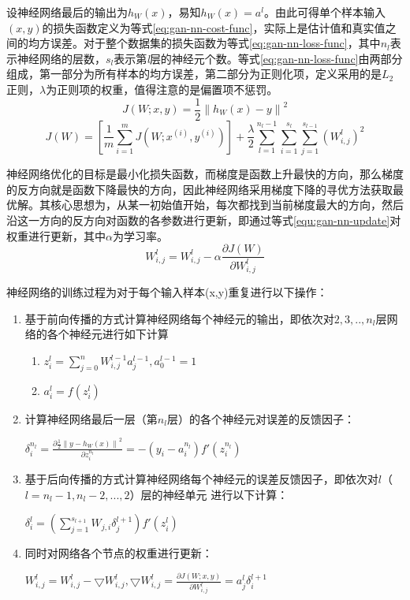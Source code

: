 设神经网络最后的输出为$h_{W}(x)$，易知$ h_{W}(x) = a^{l}$。由此可得单个样本输入$(x,y)$的损失函数定义为等式\ref{eq:gan-nn-cost-func}，实际上是估计值和真实值之间的均方误差。对于整个数据集的损失函数为等式\ref{eq:gan-nn-loss-func}，其中$n_{l}$表示神经网络的层数，$s_{l}$表示第\emph{l}层的神经元个数。等式\ref{eq:gan-nn-loss-func}由两部分组成，第一部分为所有样本的均方误差，第二部分为正则化项，定义采用的是$L_{2}$正则，$\lambda$为正则项的权重，值得注意的是偏置项不惩罚。
\begin{equation}
\label{eq:gan-nn-cost-func}
J(W;x,y) = \frac{1}{2}\left \| h_{W}(x) - y \right \|^{2}
\end{equation}
\begin{equation}
\label{eq:gan-nn-loss-func}
J(W) = [\frac{1}{m}\sum_{i=1}^{m}J(W;x^{(i)}, y^{(i)})] + \frac{\lambda}{2}\sum_{l=1}^{n_{l}-1}\sum_{i=1}^{s_{l}}\sum_{j=1}^{s_{l-1}}(W_{i,j}^{l})^{2}
\end{equation}

神经网络优化的目标是最小化损失函数，而梯度是函数上升最快的方向，那么梯度的反方向就是函数下降最快的方向，因此神经网络采用梯度下降的寻优方法获取最优解。其核心思想为，从某一初始值开始，每次都找到当前梯度最大的方向，然后沿这一方向的反方向对函数的各参数进行更新，即通过等式\ref{equ:gan-nn-update}对权重进行更新，其中$\alpha$为学习率。
\begin{equation}
\label{equ:gan-nn-update}
W_{i,j}^{l} = W_{i,j}^{l} - \alpha \frac{\partial J(W)}{\partial W_{i,j}^{l}} 
\end{equation}

神经网络的训练过程为对于每个输入样本(x,y)重复进行以下操作：
\begin{enumerate}[1.]
  \item 基于前向传播的方式计算神经网络每个神经元的输出，即依次对$2,3,..,n_{l}$层网络的各个神经元进行如下计算
  \begin{enumerate}
    \item $z_{i}^{l} = \sum_{j=0}^{n}W_{i,j}^{l-1}a_{j}^{l-1}, a_{0}^{l-1}=1$
    \item $a_{i}^{l} = f(z_{i}^{l})$
  \end{enumerate}
  \item 计算神经网络最后一层（第$n_{l}$层）的各个神经元对误差的反馈因子：

  $\delta_{i}^{n_{l}} = \frac{\partial \frac{1}{2} \left \| y - h_{W}(x) \right \|^{2}}{\partial z_{i}^{n_{l}}} = -(y_{i}-a_{i}^{n_{l}} )f'(z_{i}^{n_{l}})$

  \item 基于后向传播的方式计算神经网络每个神经元的误差反馈因子，即依次对$l$（$l=n_{l}-1, n_{l}-2, ..., 2$）层的神经单元 进行以下计算：

  $\delta_{i}^{l} =(\sum_{j=1}^{s_{l+1}}W_{j,i}\delta_{j}^{l+1})f'(z_{i}^{l})$

  \item 同时对网络各个节点的权重进行更新：

  $W_{i,j}^{l} = W_{i,j}^{l}- \bigtriangledown W_{i,j}^{l}, \bigtriangledown W_{i,j}^{l} = \frac{\partial J(W;x,y)}{\partial W_{i,j}^{l}} = a_{j}^{l}\delta_{i}^{l+1}$

\end{enumerate}


